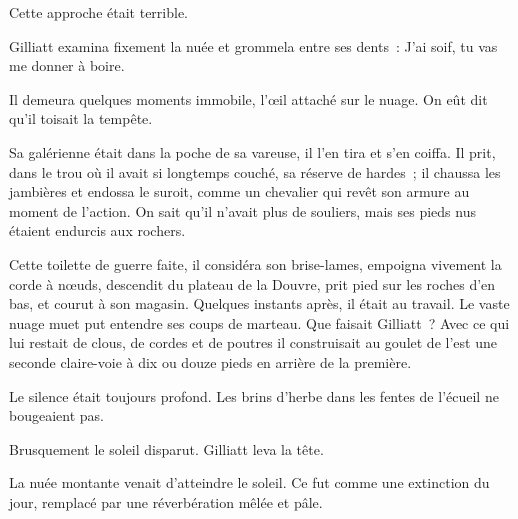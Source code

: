\documentclass[french,twoside]{book} %
\begin{document}
Cette approche était terrible.\par
Gilliatt examina fixement la nuée et grommela entre ses dents : J’ai soif, tu vas me donner à boire.\par
Il demeura quelques moments immobile, l’œil attaché sur le nuage. On eût dit qu’il toisait la tempête.\par
Sa galérienne était dans la poche de sa vareuse, il  l’en tira et s’en coiffa. Il prit, dans le trou où il avait si longtemps couché, sa réserve de hardes ; il chaussa les jambières et endossa le suroit, comme un chevalier qui revêt son armure au moment de l’action. On sait qu’il n’avait plus de souliers, mais ses pieds nus étaient endurcis aux rochers.\par
Cette toilette de guerre faite, il considéra son brise-lames, empoigna vivement la corde à nœuds, descendit du plateau de la Douvre, prit pied sur les roches d’en bas, et courut à son magasin. Quelques instants après, il était au travail. Le vaste nuage muet put entendre ses coups de marteau. Que faisait Gilliatt ? Avec ce qui lui restait de clous, de cordes et de poutres il construisait au goulet de l’est une seconde claire-voie à dix ou douze pieds en arrière de la première.\par
Le silence était toujours profond. Les brins d’herbe dans les fentes de l’écueil ne bougeaient pas.\par
Brusquement le soleil disparut. Gilliatt leva la tête.\par
La nuée montante venait d’atteindre le soleil. Ce fut comme une extinction du jour, remplacé par une réverbération mêlée et pâle.\par
\end{document}
